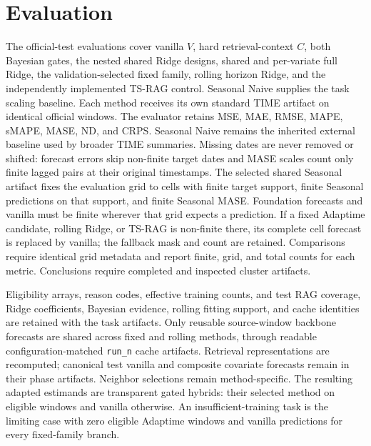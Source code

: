 \documentclass[10pt]{article}
\begin{document}
\section{Evaluation}

The official-test evaluations cover vanilla $V$, hard retrieval-context $C$,
both Bayesian gates, the nested shared Ridge designs, shared and per-variate
full Ridge, the validation-selected fixed family, rolling horizon Ridge, and
the independently implemented TS-RAG control. Seasonal Naive supplies the task
scaling baseline. Each method receives its own standard TIME artifact on
identical official windows. The evaluator retains
MSE, MAE, RMSE, MAPE, sMAPE, MASE, ND, and CRPS. Seasonal Naive remains the
inherited external baseline used by broader TIME summaries. Missing dates are
never removed or shifted: forecast errors skip non-finite target dates and
MASE scales count only finite lagged pairs at their original timestamps. The
selected shared Seasonal artifact fixes the evaluation grid to cells with
finite target support, finite Seasonal predictions on that support, and finite
Seasonal MASE. Foundation forecasts and vanilla must be finite wherever that
grid expects a prediction. If a fixed Adaptime candidate, rolling Ridge, or
TS-RAG is non-finite there, its complete cell forecast is replaced by vanilla;
the fallback mask and count are retained. Comparisons require identical grid
metadata and report finite, grid, and total counts for each metric.
Conclusions require completed and inspected cluster artifacts.

Eligibility arrays, reason codes, effective training counts, and test RAG
coverage, Ridge coefficients, Bayesian evidence, rolling fitting support, and
cache identities are retained with the task artifacts. Only reusable
source-window backbone forecasts are shared across fixed and rolling methods,
through readable configuration-matched \texttt{run\_n} cache artifacts. Retrieval
representations are recomputed; canonical test vanilla and composite covariate
forecasts remain in their phase artifacts. Neighbor selections remain
method-specific. The resulting adapted estimands are transparent gated hybrids:
their selected method on eligible windows and vanilla otherwise. An
insufficient-training task is the limiting case with zero eligible Adaptime
windows and vanilla predictions for every fixed-family branch.
\end{document}
